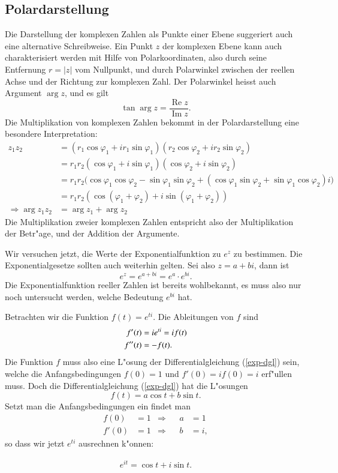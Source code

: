 \subsection{Polardarstellung}
Die Darstellung der komplexen Zahlen als Punkte einer Ebene suggeriert
auch eine alternative Schreibweise.
Ein Punkt $z$ der komplexen Ebene kann auch charakterisiert werden mit Hilfe von
Polarkoordinaten, also durch seine Entfernung $r=|z|$ vom Nullpunkt,
und durch Polarwinkel zwischen der reellen Achse und der Richtung
zur komplexen Zahl. Der Polarwinkel heisst auch Argument $\operatorname{arg}z$,
und es gilt
\[
\tan\operatorname{arg}z=\frac{\operatorname{Re}z}{\operatorname{Im}z}.
\]
Die Multiplikation von komplexen Zahlen bekommt in der Polardarstellung
eine besondere Interpretation:
\begin{align*}
z_1z_2
&=
(r_1\cos\varphi_1+ir_1\sin\varphi_1) (r_2\cos\varphi_2+ir_2\sin\varphi_2)
\\
&=
r_1r_2(\cos\varphi_1+i\sin\varphi_1) (\cos\varphi_2+i\sin\varphi_2)
\\
&=
r_1r_2\bigl(
\cos\varphi_1\cos\varphi_2-\sin\varphi_1\sin\varphi_2 +
(\cos\varphi_1\sin\varphi_2+\sin\varphi_1\cos\varphi_2)i\bigr)
\\
&=
r_1r_2(\cos(\varphi_1+\varphi_2)+i\sin(\varphi_1+\varphi_2))
\\
\Rightarrow \operatorname{arg}z_1z_2&=\arg z_1 + \arg z_2
\end{align*}
Die Multiplikation zweier komplexen Zahlen entspricht also der
Multiplikation der Betr"age, und der Addition der Argumente.

Wir versuchen jetzt, die Werte der Exponentialfunktion zu $e^z$ zu
bestimmen.
Die Exponentialgesetze sollten auch weiterhin gelten.
Sei also $z=a+bi$, dann ist
\[
e^z=e^{a+bi}=e^a\cdot e^{bi}.
\]
Die Exponentialfunktion reeller Zahlen ist bereits wohlbekannt, es muss
also nur noch untersucht werden, welche Bedeutung $e^{bi}$ hat.

Betrachten wir die Funktion $f(t)= e^{ti}$. Die Ableitungen von $f$ sind
\begin{align}
f'(t)&=ie^{ti}=if(t)\notag\\
f''(t)&=-f(t).\label{exp-dgl}
\end{align}
Die Funktion $f$ muss also eine L"osung der Differentialgleichung
(\ref{exp-dgl}) sein, welche die Anfangsbedingungen $f(0)=1$ und
$f'(0)=if(0)=i$ erf"ullen muss.
Doch die Differentialgleichung (\ref{exp-dgl}) hat die L"osungen
\[
f(t)=a\cos t+b\sin t.
\]
Setzt man die Anfangsbedingungen ein findet man
\begin{align*}
f(0)&=1&\Rightarrow&&a&=1\\
f'(0)&=1&\Rightarrow&&b&=i,
\end{align*}
so dass wir jetzt $e^{ti}$ ausrechnen k"onnen:
\begin{satz}[Euler]
\begin{align}
e^{it}=\cos t+i\sin t.
\label{euler-formula}
\end{align}
\end{satz}

